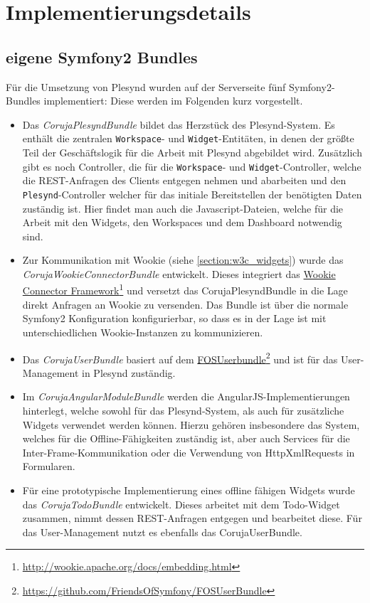 \section{Implementierungsdetails}\label{section:implementierungsdetails}

\subsection{eigene Symfony2 Bundles}\label{section:backend}
Für die Umsetzung von Plesynd wurden auf der Serverseite fünf Symfony2-Bundles implementiert: Diese werden im Folgenden kurz vorgestellt.

\begin{itemize}
\item Das \emph{CorujaPlesyndBundle} bildet das Herzstück des Plesynd-System. Es enthält die zentralen \texttt{Workspace}- und \texttt{Widget}-Entitäten, in denen der größte Teil der Geschäftslogik für die Arbeit mit Plesynd abgebildet wird. Zusätzlich gibt es noch Controller, die für die \texttt{Workspace}- und \texttt{Widget}-Controller, welche die REST-Anfragen des Clients entgegen nehmen und abarbeiten und den \texttt{Plesynd}-Controller welcher für das initiale Bereitstellen der benötigten Daten zuständig ist. Hier findet man auch die Javascript-Dateien, welche für die Arbeit mit den Widgets, den Workspaces und dem Dashboard notwendig sind.
\item Zur Kommunikation mit Wookie (siehe \ref{section:w3c_widgets}) wurde das \emph{CorujaWookieConnectorBundle} entwickelt. Dieses integriert das \href{http://wookie.apache.org/docs/embedding.html}{Wookie Connector Framework}\footnote{\url{http://wookie.apache.org/docs/embedding.html}} und versetzt das CorujaPlesyndBundle in die Lage direkt Anfragen an Wookie zu versenden. Das Bundle ist über die normale Symfony2 Konfiguration konfigurierbar, so dass es in der Lage ist mit unterschiedlichen Wookie-Instanzen zu kommunizieren.
\item Das \emph{CorujaUserBundle} basiert auf dem \href{https://github.com/FriendsOfSymfony/FOSUserBundle}{FOSUserbundle}\footnote{\url{https://github.com/FriendsOfSymfony/FOSUserBundle}} und ist für das User-Management in Plesynd zuständig.
\item Im \emph{CorujaAngularModuleBundle} werden die AngularJS-Implementierungen hinterlegt, welche sowohl für das Plesynd-System, als auch für zusätzliche Widgets verwendet werden können. Hierzu gehören insbesondere das System, welches für die Offline-Fähigkeiten zuständig ist, aber auch Services für die Inter-Frame-Kommunikation oder die Verwendung von HttpXmlRequests in Formularen.  
\item Für eine prototypische Implementierung eines offline fähigen Widgets wurde das \emph{CorujaTodoBundle} entwickelt. Dieses arbeitet mit dem Todo-Widget zusammen, nimmt dessen REST-Anfragen entgegen und bearbeitet diese. Für das User-Management nutzt es ebenfalls das CorujaUserBundle.
\end{itemize}

